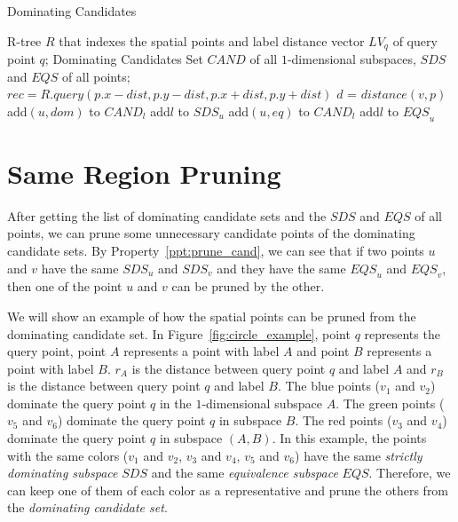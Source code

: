 \begin{algorithm}[H]
  \caption{Dominating Candidates}\label{algo:blah}
  \begin{algorithmic}[1]
  \show\LOOP
    \REQUIRE R-tree $R$ that indexes the spatial points and label distance vector $LV_q$ of query point $q$;
    \ENSURE Dominating Candidates Set $\mathit{CAND}$ of all $1$-dimensional subspaces, $\mathit{SDS}$ and $\mathit{EQS}$ of all points;
            \STATE $rec = R.query(p.x-dist, p.y-dist, p.x+dist, p.y+dist)$
                \STATE $d$ = $distance(v, p)$
                    \STATE add$(u, dom)$ to $\mathit{CAND}_l$
                    \STATE add$l$ to $\mathit{SDS}_u$
                \ENDIF
                    \STATE add$(u, eq)$ to $\mathit{CAND}_l$
                    \STATE add$l$ to $\mathit{EQS}_u$
                \ENDIF
            \ENDFOR
            
        \ENDFOR
    \ENDFOR
  \end{algorithmic}
\end{algorithm}

\section{Same Region Pruning}
After getting the list of dominating candidate sets and the $\mathit{SDS}$ and $\mathit{EQS}$ of all points, we can prune some unnecessary candidate points of the dominating candidate sets. By Property~\ref{ppt:prune_cand}, we can see that if two points $u$ and $v$ have the same $\mathit{SDS}_u$ and $\mathit{SDS}_v$ and they have the same $\mathit{EQS}_u$ and $\mathit{EQS}_v$, then one of the point $u$ and $v$ can be pruned by the other.

We will show an example of how the spatial points can be pruned from the dominating candidate set. In Figure~\ref{fig:circle_example}, point $q$ represents the query point, point $A$ represents a point with label $A$ and point $B$ represents a point with label $B$. $r_{A}$ is the distance between query point $q$ and label $A$ and $r_{B}$ is the distance between query point $q$ and label $B$. The blue points ($v_1$ and $v_2$) dominate the query point $q$ in the $1$-dimensional subspace $A$. The green points ($v_5$ and $v_6$) dominate the query point $q$ in subspace $B$. The red points ($v_3$ and $v_4$) dominate the query point $q$ in subspace $(A, B)$. In this example, the points with the same colors ($v_1$ and $v_2$, $v_3$ and $v_4$, $v_5$ and $v_6$) have the same \emph{strictly dominating subspace} $\mathit{SDS}$ and the same \emph{equivalence subspace} $\mathit{EQS}$. Therefore, we can keep one of them of each color as a representative and prune the others from the \emph{dominating candidate set}.


